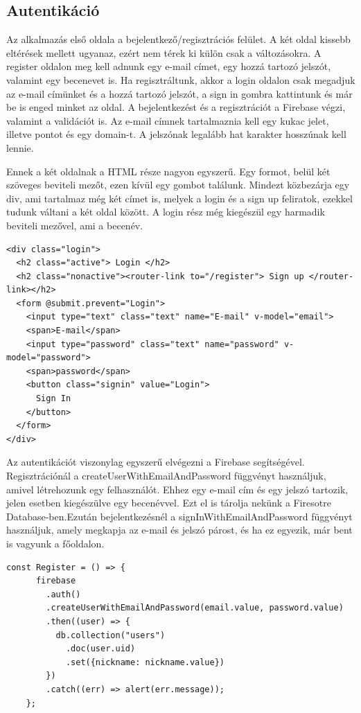 \subsection{Autentikáció}
Az alkalmazás első oldala a bejelentkező/regisztrációs felület. A két oldal kissebb eltérések mellett ugyanaz, ezért nem térek ki külön csak a változásokra. A register oldalon meg kell adnunk egy e-mail címet, egy hozzá tartozó jelszót, valamint egy becenevet is. Ha regisztráltunk, akkor a login oldalon csak megadjuk az e-mail címünket és a hozzá tartozó jelszót, a sign in gombra kattintunk és már be is enged minket az oldal. A bejelentkezést és a regisztrációt a Firebase végzi, valamint a validációt is. Az e-mail címnek tartalmaznia kell egy kukac jelet, illetve pontot és egy domain-t. A jelszónak legalább hat karakter hosszúnak kell lennie.

Ennek a két oldalnak a HTML része nagyon egyszerű. Egy formot, belül két szöveges beviteli mezőt, ezen kívül egy gombot találunk. Mindezt közbezárja egy div, ami tartalmaz még két címet is, melyek a login és a sign up feliratok, ezekkel tudunk váltani a két oldal között. A login rész még kiegészül egy harmadik beviteli mezővel, ami a becenév.

\begin{lstlisting}[style=htmlcssjs]
<div class="login">
  <h2 class="active"> Login </h2>
  <h2 class="nonactive"><router-link to="/register"> Sign up </router-link></h2> 
  <form @submit.prevent="Login">
    <input type="text" class="text" name="E-mail" v-model="email">
    <span>E-mail</span>
    <input type="password" class="text" name="password" v-model="password">
    <span>password</span>
    <button class="signin" value="Login">
      Sign In
    </button>
  </form>
</div>
\end{lstlisting}

Az autentikációt viszonylag egyszerű elvégezni a Firebase segítségével. Regisztrációnál a createUserWithEmailAndPassword függvényt használjuk, amivel létrehozunk egy felhasználót. Ehhez egy e-mail cím és egy jelszó tartozik, jelen esetben kiegészülve egy becenévvel. Ezt el is tárolja nekünk a Firesotre Database-ben.Ezután bejelentkezésnél a signInWithEmailAndPassword függvényt használjuk, amely megkapja az e-mail és jelszó párost, és ha ez egyezik, már bent is vagyunk a főoldalon.

\begin{lstlisting}[style=htmlcssjs]
const Register = () => {
      firebase
        .auth()
        .createUserWithEmailAndPassword(email.value, password.value)
        .then((user) => {
          db.collection("users")
            .doc(user.uid)
            .set({nickname: nickname.value})
        })
        .catch((err) => alert(err.message));
    };
\end{lstlisting}

